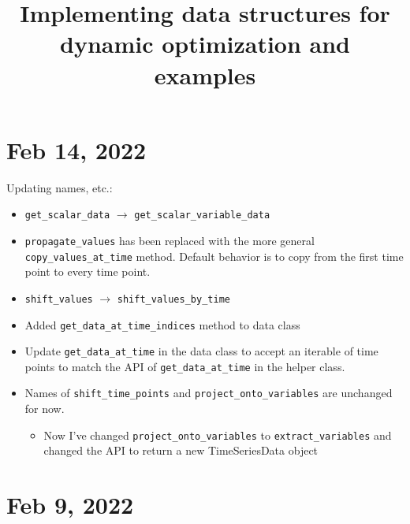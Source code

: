 \documentclass{article}
\title{Implementing data structures for dynamic optimization and examples}
\begin{document}
\maketitle

\section{Feb 14, 2022}

Updating names, etc.:
\begin{itemize}
  \item \texttt{get\_scalar\_data} $\rightarrow$
    \texttt{get\_scalar\_variable\_data}
  \item \texttt{propagate\_values} has been replaced with the more
    general \texttt{copy\_values\_at\_time} method.
    Default behavior is to copy from the first time point to every
    time point.
  \item \texttt{shift\_values} $\rightarrow$
    \texttt{shift\_values\_by\_time}
  \item Added \texttt{get\_data\_at\_time\_indices} method to data class
  \item Update \texttt{get\_data\_at\_time} in the data class to accept
    an iterable of time points to match the API of \texttt{get\_data\_at\_time}
    in the helper class.
  \item Names of \texttt{shift\_time\_points} and
    \texttt{project\_onto\_variables} are unchanged for now.
    \begin{itemize}
      \item Now I've changed \texttt{project\_onto\_variables} to
	\texttt{extract\_variables} and changed the API to return a new
	TimeSeriesData object
    \end{itemize}
\end{itemize}

\section{Feb 9, 2022}
\end{document}
